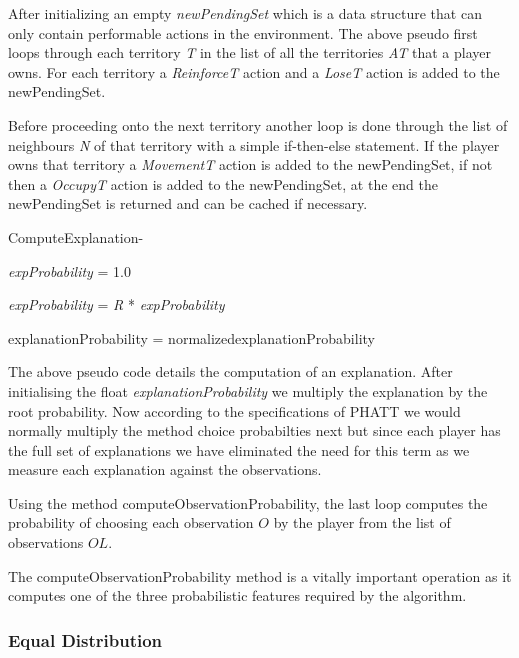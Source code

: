 \documentclass[parskip]{cs4rep}
\begin{document}
After initializing an empty \textit{newPendingSet} which is a data structure that can only contain performable actions in the environment. The above pseudo first loops through each territory \textit{T} in the list of all the territories \textit{AT} that a player owns. For each territory a \textit{ReinforceT} action and a \textit{LoseT} action is added to the newPendingSet. 

Before proceeding onto the next territory another loop is done through the list of neighbours \textit{N} of that territory with a simple if-then-else statement. If the player owns that territory a \textit{MovementT} action is added to the newPendingSet, if not then a \textit{OccupyT} action is added to the newPendingSet, at the end the newPendingSet is returned and can be cached if necessary.

\begin{pseudocode}[ruled]{ComputeExplanation}{-}
\begin{algorithm}[H]

\textit{expProbability} = 1.0

\textit{expProbability} = \textit{R} * \textit{expProbability}	


explanationProbability = normalized{explanationProbability}

\end{algorithm}
\end{pseudocode}

The above pseudo code details the computation of an explanation. After initialising the float \textit{explanationProbability} we multiply the explanation by the root probability. Now according to the specifications of PHATT we would normally multiply the method choice probabilties next but since each player has the full set of explanations we have eliminated the need for this term as we measure each explanation against the observations.

Using the method computeObservationProbability, the last loop computes the probability of choosing each observation $O$ by the player from the list of observations $OL$.

The computeObservationProbability method is a vitally important operation as it computes one of the three probabilistic features required by the algorithm.

\subsubsection{Equal Distribution}
\end{document}

